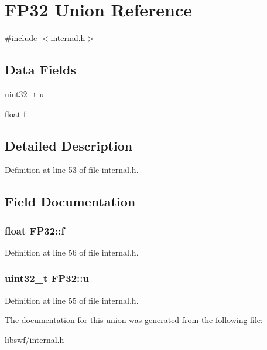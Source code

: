 \hypertarget{union_f_p32}{\section{F\-P32 Union Reference}
\label{union_f_p32}
}


{\ttfamily \#include $<$internal.\-h$>$}

\subsection*{Data Fields}
\begin{DoxyCompactItemize}
\item 
uint32\-\_\-t \hyperlink{union_f_p32_a28a311edc9a2e56d51065df80cdc0a35}{u}
\item 
float \hyperlink{union_f_p32_a99400b2db2cb93c0131abc42114eb634}{f}
\end{DoxyCompactItemize}


\subsection{Detailed Description}


Definition at line 53 of file internal.\-h.



\subsection{Field Documentation}
\hypertarget{union_f_p32_a99400b2db2cb93c0131abc42114eb634}{
\subsubsection[{f}]{\setlength{\rightskip}{0pt plus 5cm}float F\-P32\-::f}}\label{union_f_p32_a99400b2db2cb93c0131abc42114eb634}


Definition at line 56 of file internal.\-h.

\hypertarget{union_f_p32_a28a311edc9a2e56d51065df80cdc0a35}{
\subsubsection[{u}]{\setlength{\rightskip}{0pt plus 5cm}uint32\-\_\-t F\-P32\-::u}}\label{union_f_p32_a28a311edc9a2e56d51065df80cdc0a35}


Definition at line 55 of file internal.\-h.



The documentation for this union was generated from the following file\-:\begin{DoxyCompactItemize}
\item 
libswf/\hyperlink{internal_8h}{internal.\-h}\end{DoxyCompactItemize}
